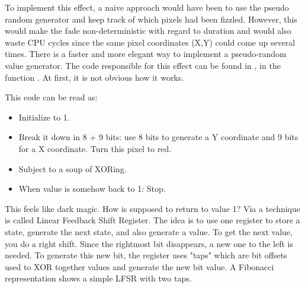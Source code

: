 To implement this effect, a naive approach would have been to use the pseudo random generator  and keep track of which pixels had been fizzled. However, this would make the fade non-deterministic with regard to duration and would also waste CPU cycles since the same pixel coordinates (X,Y) could come up several times. There is a faster and more elegant way to implement a pseudo-random value generator. The code responsible for this effect can be found in , in the function . At first, it is not obvious how it works.\\
\par
\begin{minipage}{\textwidth}

\end{minipage}
\par
This code can be read as:\\
\begin{itemize}
\item Initialize  to 1.
\item Break it down in 8 + 9 bits: use 8 bits to generate a Y coordinate and 9 bits for a X coordinate. Turn this pixel to red.
\item Subject  to a soup of XORing.
\item When  value is somehow back to 1: Stop.
\end{itemize}        
This feels like dark magic. How is  supposed to return to value 1? Via a technique is called Linear Feedback Shift Register. The idea is to use one register to store a state, generate the next state, and also generate a value. To get the next value, you do a right shift. Since the rightmost bit disappears, a new one to the left is needed. To generate this new bit, the register uses "taps" which are bit offsets used to XOR together values and generate the new bit value. A Fibonacci representation shows a simple LFSR with two taps.\\
\par

